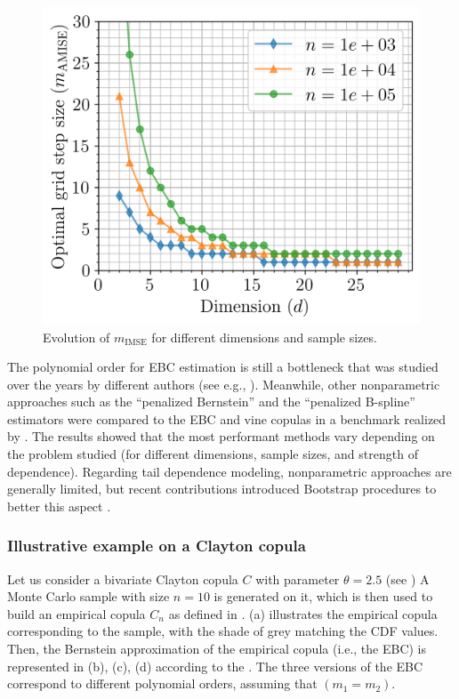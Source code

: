 \begin{figure}
    \centering
    \includegraphics[width=0.5\linewidth]{../numerical_experiments/chapter3/figures/hAMISE.png}
    \caption{Evolution of $m_{\mathrm{IMSE}}$ for different dimensions and sample sizes.}
    \label{fig:hmise}
\end{figure}

The polynomial order for EBC estimation is still a bottleneck that was studied over the years by different authors (see e.g., \citealp{janssen_2012_ebc,bouezmarni_2013_EBC_convergence,rose_2015,segers_2017}).  
Meanwhile, other nonparametric approaches such as the ``penalized Bernstein'' and the ``penalized B-spline'' estimators were compared to the EBC and vine copulas in a benchmark realized by \citet{nagler_2017}. 
The results showed that the most performant methods vary depending on the problem studied (for different dimensions, sample sizes, and strength of dependence). 
Regarding tail dependence modeling, nonparametric approaches are generally limited, but recent contributions introduced Bootstrap procedures to better this aspect \citep{kiriliouk_2021_resampling}.


\subsubsection{Illustrative example on a Clayton copula}
Let us consider a bivariate Clayton copula $C$ with parameter $\theta=2.5$ (see \citealp{nelsen_2006_copulas})
A Monte Carlo sample with size $n=10$ is generated on it, which is then used to build an empirical copula $C_n$ as defined in . 
 (a) illustrates the empirical copula corresponding to the sample, with the shade of grey matching the CDF values. 
Then, the Bernstein approximation of the empirical copula (i.e., the EBC)  is represented in  (b), (c), (d) according to the . 
The three versions of the EBC correspond to different polynomial orders, assuming that $(m_1=m_2)$. 


